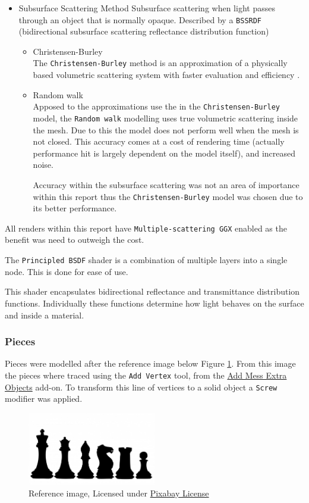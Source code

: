 \documentclass[11pt]{article}
\begin{document}
\begin{itemize}
\item Subsurface Scattering Method
Subsurface scattering when light passes through an object that is normally
opaque. Described by a \texttt{BSSRDF} (bidirectional subsurface scattering
reflectance distribution function)
\begin{itemize}
\item Christensen-Burley \\
The \texttt{Christensen-Burley} method is an approximation of a physically based
volumetric scattering system with faster evaluation and efficiency \cite{Christensen-Burley}.
\item Random walk \\
Apposed to the approximations use the in the \texttt{Christensen-Burley} model,
the \texttt{Random walk} modelling uses true volumetric scattering inside the mesh.
Due to this the model does not perform well when the mesh is not closed.
This accuracy comes at a cost of rendering time (actually performance hit is largely
dependent on the model itself), and increased noise.

Accuracy within the subsurface scattering was not an area of importance
within this report thus the \texttt{Christensen-Burley} model was chosen due to
its better performance.
\end{itemize}
\end{itemize}

All renders within this report have \texttt{Multiple-scattering GGX} enabled as the
benefit was need to outweigh the cost.

The \texttt{Principled BSDF} shader is a combination of multiple layers into a single
node. This is done for ease of use.

This shader encapsulates bidirectional reflectance and transmittance
distribution functions. Individually these functions determine how light behaves
on the surface and inside a material.


\subsubsection{Pieces}
\label{sec:org73ca83a}
Pieces were modelled after the reference image below Figure \ref{piece-reference}.
From this image the pieces where traced using the \texttt{Add Vertex} tool, from the
\href{https://docs.blender.org/manual/en/2.92/addons/add\_mesh/mesh\_extra\_objects.html}{Add Mess Extra Objects} add-on. To transform this line of vertices to a solid
object  a \texttt{Screw} modifier was applied.
\begin{figure}[htbp]
\centering
\includegraphics[width=0.5\textwidth]{ref/bee5aa3d08a30da4ca1005cbd0fe10b54a03bb49.jpg}
\caption{\label{piece-reference}Reference image, Licensed under \href{https://pixabay.com/service/license/}{Pixabay License}}
\end{figure}
\end{document}
